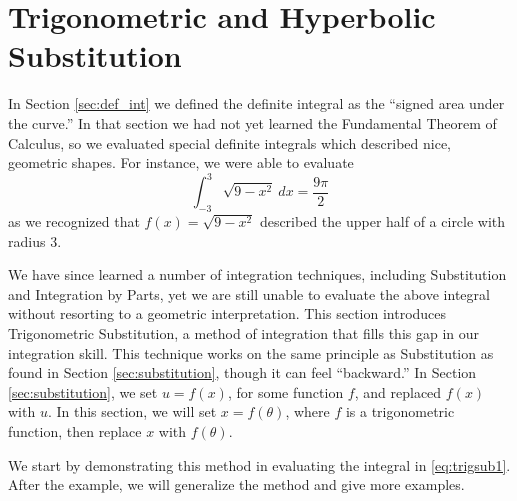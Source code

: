 \section{Trigonometric and Hyperbolic Substitution}\label{sec:trig_sub}

In Section \ref{sec:def_int} we defined the definite integral as the ``signed area under the curve.'' In that section we had not yet learned the Fundamental Theorem of Calculus, so we evaluated special definite integrals which described nice, geometric shapes. For instance, we were able to evaluate
\begin{equation}
\int_{-3}^3\sqrt{9-x^2}\ dx = \frac{9\pi}{2}\label{eq:trigsub1}
\end{equation}
 as we recognized that $f(x) = \sqrt{9-x^2}$ described the upper half of a circle with radius 3. 

We have since learned a number of integration techniques, including Substitution and Integration by Parts, yet we are still unable to evaluate the above integral without resorting to a geometric interpretation. This section introduces Trigonometric Substitution, a method of integration that fills this gap in our integration skill. This technique works on the same principle as Substitution as found in Section \ref{sec:substitution}, though it can feel ``backward.'' In Section \ref{sec:substitution}, we set $u=f(x)$, for some function $f$, and replaced $f(x)$ with $u$. In this section, we will set $x=f(\theta)$, where $f$ is a trigonometric function, then replace $x$ with $f(\theta)$. 

We start by demonstrating this method in evaluating the integral in \eqref{eq:trigsub1}. After the example, we will generalize the method and give more examples.\\
\enlargethispage{3\baselineskip}

